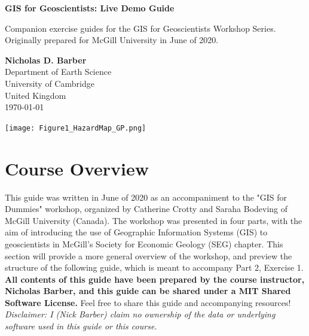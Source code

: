 \documentclass{article}
\begin{document}
\begin{titlepage}
   \begin{center}
       \vspace*{1cm}

       \LARGE
       \textbf{GIS for Geoscientists: Live Demo Guide}
       
       \Large
       \vspace{0.3cm}
        Companion exercise guides for the GIS for Geoscientists Workshop Series. Originally prepared for McGill University in June of 2020. 
            
       \vspace{1.2cm}
       \textbf{Nicholas D. Barber}\\
       Department of Earth Science\\
       University of Cambridge\\
       United Kingdom\\
       \today
            
       \vspace{0.8cm}
     
       \texttt{[image: Figure1\_HazardMap\_GP.png]}
   \end{center}
\end{titlepage}

\tableofcontents

\section{Course Overview}

This guide was written in June of 2020 as an accompaniment to the "GIS for Dummies" workshop, organized by Catherine Crotty and Saraha Bodeving of McGill University (Canada). The workshop was presented in four parts, with the aim of introducing the use of Geographic Information Systems (GIS) to geoscientists in McGill's Society for Economic Geology (SEG) chapter. This section will provide a more general overview of the workshop, and preview the structure of the following guide, which is meant to accompany Part 2, Exercise 1. \textbf{All contents of this guide have been prepared by the course instructor, Nicholas Barber, and this guide can be shared under a MIT Shared Software License.} Feel free to share this guide and accompanying resources! \textit{Disclaimer: I (Nick Barber) claim no ownership of the data or underlying software used in this guide or this course.} 
\end{document}
